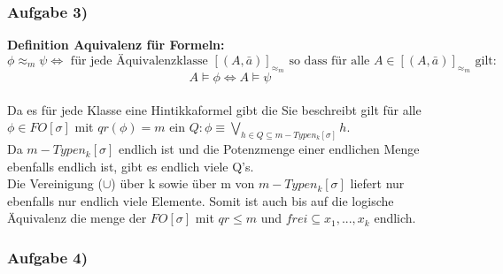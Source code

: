 \documentclass[12pt]{article}
\begin{document}
\subsubsection*{Aufgabe 3)}

\textbf{Definition Aquivalenz für Formeln: }\\
$ \phi \approx_m \psi \Leftrightarrow \text{ für jede Äquivalenzklasse } [(A,\bar a)]_{\approx_m} \text{ so dass für alle } A\in [(A,\bar a)]_{\approx_m}\text{ gilt:}$
\[ A\models \phi \Leftrightarrow A\models \psi \] \\
Da es für jede Klasse eine Hintikkaformel gibt die Sie beschreibt gilt für alle $\phi\in FO[\sigma] $ mit $qr(\phi) = m\text{ ein } Q: \phi \equiv \bigvee_{h\in Q\subseteq m-Typen_k[\sigma]} h$. \\
Da $m-Typen_k[\sigma]$ endlich ist und die Potenzmenge einer endlichen Menge ebenfalls endlich ist, gibt es endlich viele Q's.\\
Die Vereinigung ($\cup$) über k sowie über m von $m-Typen_k[\sigma]$ liefert nur ebenfalls nur endlich viele Elemente. Somit ist auch bis auf die logische Äquivalenz die menge der $FO[\sigma]$ mit $qr\leq m$ und $frei\subseteq {x_1,...,x_k}$ endlich.


\subsubsection*{Aufgabe 4)}
\end{document}
